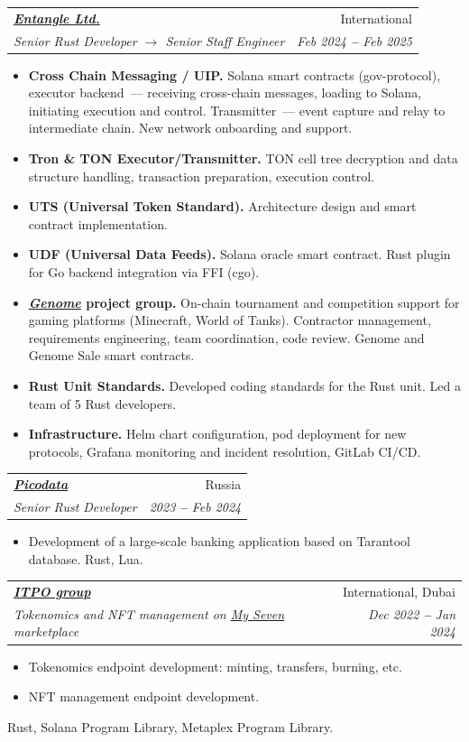 \documentclass[letterpaper,11pt]{article}
\makeatletter
\newcommand{\resumeItem}[1]{
  \item\small{
    {#1 \vspace{-2pt}}
  }
}
\newcommand{\resumeSubheading}[4]{
  \vspace{-2pt}\item
    \begin{tabular*}{0.97\textwidth}[t]{l@{\extracolsep{\fill}}r}
      \textbf{#1} & #2 \\
      \textit{\small#3} & \textit{\small #4} \\
    \end{tabular*}\vspace{-7pt}
}
\newcommand{\resumeItemListStart}{\begin{itemize}}
\newcommand{\resumeItemListEnd}{\end{itemize}\vspace{-5pt}}
\makeatother
\begin{document}
    \resumeSubheading
        {\emph{\href{https://entangle.fi/}{\color{blue}Entangle Ltd.}}}{International}
        {Senior Rust Developer $\rightarrow$ Senior Staff Engineer}{Feb 2024 \textbf{--} Feb 2025}
        \resumeItemListStart
            \resumeItem{\textbf{Cross Chain Messaging / UIP.} Solana smart contracts (gov-protocol), executor backend~--- receiving cross-chain messages, loading to Solana, initiating execution and control. Transmitter~--- event capture and relay to intermediate chain. New network onboarding and support.}
            \resumeItem{\textbf{Tron \& TON Executor/Transmitter.} TON cell tree decryption and data structure handling, transaction preparation, execution control.}
            \resumeItem{\textbf{UTS (Universal Token Standard).} Architecture design and smart contract implementation.}
            \resumeItem{\textbf{UDF (Universal Data Feeds).} Solana oracle smart contract. Rust plugin for Go backend integration via FFI (cgo).}
            \resumeItem{\textbf{\emph{\href{https://genomeprotocol.com/}{\color{blue}Genome}} project group.} On-chain tournament and competition support for gaming platforms (Minecraft, World of Tanks). Contractor management, requirements engineering, team coordination, code review. Genome and Genome Sale smart contracts.}
            \resumeItem{\textbf{Rust Unit Standards.} Developed coding standards for the Rust unit. Led a team of 5 Rust developers.}
            \resumeItem{\textbf{Infrastructure.} Helm chart configuration, pod deployment for new protocols, Grafana monitoring and incident resolution, GitLab CI/CD.}
        \resumeItemListEnd

    \resumeSubheading
        {\emph{\href{https://picodata.io/}{\color{blue}Picodata}}}{Russia}
        {Senior Rust Developer}{2023 \textbf{--} Feb 2024}
        \resumeItemListStart
            \resumeItem{Development of a large-scale banking application based on Tarantool database. Rust, Lua.}
        \resumeItemListEnd

    \resumeSubheading
        {\emph{\href{http://itpo.group/}{\color{blue}ITPO group}}}{International, Dubai}
        {Tokenomics and NFT management on \emph{\href{https://www.myseven.io/}{\color{blue}My Seven}} marketplace}{Dec 2022 \textbf{--} Jan 2024}
        \resumeItemListStart
            \resumeItem{Tokenomics endpoint development: minting, transfers, burning, etc.}
            \resumeItem{NFT management endpoint development.}
        \resumeItemListEnd
        Rust, Solana Program Library, Metaplex Program Library.
\end{document}
